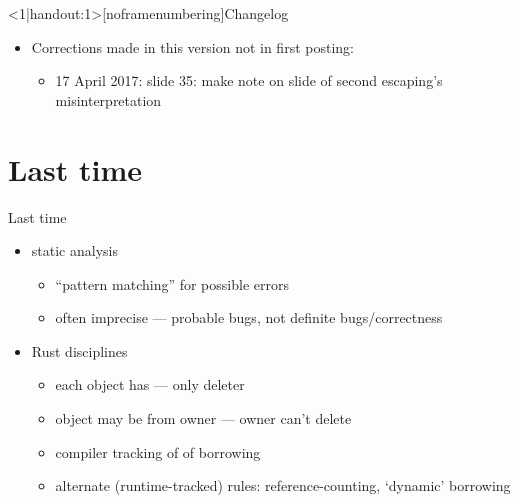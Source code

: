 \begin{frame}
    \titlepage
\end{frame}

{
\begin{frame}<1|handout:1>[noframenumbering]{Changelog}
    \begin{itemize}
        \item Corrections made in this version not in first posting:
        \begin{itemize}
            \item 17 April 2017: slide 35: make note on slide of second escaping's misinterpretation
        \end{itemize}
    \end{itemize}
\end{frame}
}




\section{Last time}

\begin{frame}{Last time}
    \begin{itemize}
    \item static analysis
        \begin{itemize}
        \item ``pattern matching'' for possible errors
        \item often imprecise --- probable bugs, not definite bugs/correctness
        \end{itemize}
    \item Rust disciplines 
        \begin{itemize}
        \item each object has  --- only deleter
        \item object may be  from owner --- owner can't delete
        \item compiler tracking of  of borrowing
        \item alternate (runtime-tracked) rules: reference-counting, `dynamic' borrowing
        \end{itemize}
    \end{itemize}
\end{frame}

